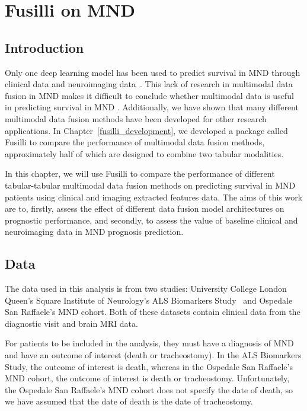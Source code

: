\chapter{Fusilli on MND}
\label{fusilli_on_mnd}

\section{Introduction}
Only one deep learning model has been used to predict survival in MND through clinical data and neuroimaging data~\cite{vanderburghDeepLearningPredictions2017}.
This lack of research in multimodal data fusion in MND makes it difficult to conclude whether multimodal data is useful in predicting survival in MND .
Additionally, we have shown that many different multimodal data fusion methods have been developed for other research applications.
In Chapter~\ref{fusilli_development}, we developed a package called Fusilli to compare the performance of multimodal data fusion methods, approximately half of which are designed to combine two tabular modalities.

In this chapter, we will use Fusilli to compare the performance of different tabular-tabular multimodal data fusion methods on predicting survival in MND patients using clinical and imaging extracted features data.
The aims of this work are to, firstly, assess the effect of different data fusion model architectures on prognostic performance, and secondly, to assess the value of baseline clinical and neuroimaging data in MND prognosis prediction.

\section{Data}

The data used in this analysis is from two studies: University College London Queen's Square Institute of Neurology's ALS Biomarkers Study~\cite{UKMNDCSG} and Ospedale San Raffaele's MND cohort.
Both of these datasets contain clinical data from the diagnostic visit and brain MRI data.

For patients to be included in the analysis, they must have a diagnosis of MND and have an outcome of interest (death or tracheostomy).
In the ALS Biomarkers Study, the outcome of interest is death, whereas in the Ospedale San Raffaele's MND cohort, the outcome of interest is death or tracheostomy.
Unfortunately, the Ospedale San Raffaele's MND cohort does not specify the date of death, so we have assumed that the date of death is the date of tracheostomy.

